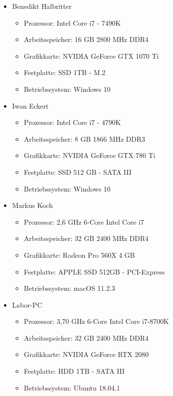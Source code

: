 \newpage

\begin{itemize}
    \item Benedikt Halbritter
    \begin{itemize}
        \item Prozessor: Intel Core i7 - 7490K
        \item Arbeitsspeicher: 16 GB 2800 MHz DDR4
        \item Grafikkarte: NVIDIA GeForce GTX 1070 Ti
        \item Festplatte: SSD 1TB - M.2
        \item Betriebssystem: Windows 10
    \end{itemize}
    \item Iwan Eckert
    \begin{itemize}
        \item Prozessor: Intel Core i7 - 4790K
        \item Arbeitsspeicher: 8 GB 1866 MHz DDR3
        \item Grafikkarte: NVIDIA GeForce GTX 780 Ti
        \item Festplatte: SSD 512 GB - SATA III
        \item Betriebssystem: Windows 10
    \end{itemize}
    \item Markus Koch
    \begin{itemize}
        \item Prozessor: 2,6 GHz 6-Core Intel Core i7
        \item Arbeitsspeicher: 32 GB 2400 MHz DDR4
        \item Grafikkarte: Radeon Pro 560X 4 GB
        \item Festplatte: APPLE SSD 512GB - PCI-Express
        \item Betriebssystem: macOS 11.2.3
    \end{itemize}
    \item Labor-PC
    \begin{itemize}
        \item Prozessor: 3,70 GHz 6-Core Intel Core i7-8700K
        \item Arbeitsspeicher: 32 GB 2400 MHz DDR4
        \item Grafikkarte: NVIDIA GeForce RTX 2080
        \item Festplatte: HDD 1TB - SATA III
        \item Betriebssystem: Ubuntu 18.04.1
    \end{itemize}
\end{itemize}

